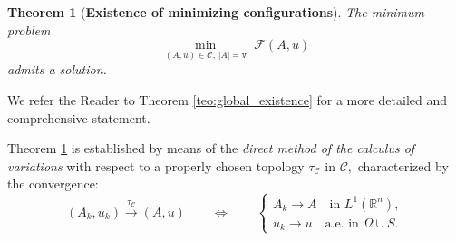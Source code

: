 \documentclass[reqno]{amsart}
\numberwithin{equation}{section}
\theoremstyle{plain}
\newtheorem{theorem}{Theorem}[section]
\theoremstyle{definition}
\newcommand{\R}{\mathbb{R}}
\newcommand{\fm}{\mathtt{v}}
\newcommand{\cF}{\mathcal{F}}
\newcommand{\admissible}{\mathcal{C}}
\begin{document}
\begin{theorem}[\textbf{Existence of minimizing configurations}]\label{teo:intro_existos}
The minimum problem 
\begin{equation}\label{shohdoahoda}
\min\limits_{(A,u)\in\admissible,\,|A|=\fm}\,\,\cF(A,u) 
\end{equation} 
admits a solution.
\end{theorem}

\noindent We refer the Reader  to Theorem \ref{teo:global_existence} for a more detailed and comprehensive statement.

Theorem \ref{teo:intro_existos}  is established by means of the \emph{direct method of the calculus of variations} with respect to a properly chosen  topology $\tau_\admissible$ in $\admissible,$ characterized by the convergence:
$$
(A_k,u_k) \overset{\tau_\admissible}{\longrightarrow} (A,u) \qquad \Longleftrightarrow\qquad 
\begin{cases}
A_k\to A \quad\text{in $L^1(\R^n),$}\\
u_k\to u \quad\text{a.e.\ in $\Omega\cup S.$}
\end{cases}
$$
\end{document}
